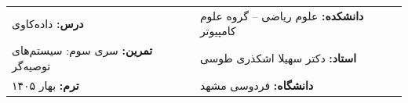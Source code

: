 \documentclass[a4paper,12pt]{article}
\begin{document}
\begin{tcolorbox}[colframe=black, colback=white, sharp corners, boxrule=1pt, arc=3pt, left=15pt, right=15pt, top=10pt, bottom=10pt]
\noindent
\begin{tabular}{@{}p{} @{}p{}}
\textbf{درس:} داده‌کاوی & \textbf{دانشکده:} علوم ریاضی -- گروه علوم کامپیوتر \\
\textbf{تمرین:} سری سوم: سیستم‌های توصیه‌گر & \textbf{استاد:} دکتر سهیلا اشکذری طوسی \\
\textbf{ترم:} بهار ۱۴۰۵ & \textbf{دانشگاه:} فردوسی مشهد \\
\end{tabular}
\end{tcolorbox}

\vspace{0.5cm}
\end{document}
